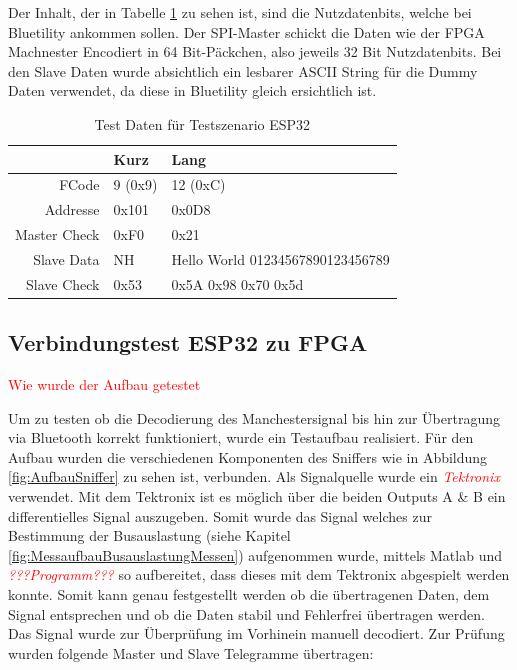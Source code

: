 Der Inhalt, der in Tabelle \ref{tab:TestDataESP32} zu sehen ist, sind die Nutzdatenbits, welche bei Bluetility ankommen sollen. Der SPI-Master schickt die Daten wie der FPGA Machnester Encodiert in 64 Bit-Päckchen, also jeweils 32 Bit Nutzdatenbits. Bei den Slave Daten wurde absichtlich ein lesbarer ASCII String für die Dummy Daten verwendet, da diese in Bluetility gleich ersichtlich ist.

\begin{table}[H]
    \centering
    \begin{tabular}{r||l|l}
         & Kurz & Lang\\ \hline
        FCode & 9 (0x9) & 12 (0xC)\\ \hline
        Addresse & 0x101 & 0x0D8\\ \hline
        Master Check & 0xF0 & 0x21\\ \hline
        Slave Data & NH & Hello World 01234567890123456789\\ \hline
        Slave Check & 0x53 & 0x5A 0x98 0x70 0x5d\\ 
    \end{tabular}
    \caption{Test Daten für Testszenario ESP32}
    \label{tab:TestDataESP32}
\end{table}




\subsection{Verbindungstest ESP32 zu FPGA}
\textcolor{red}{Wie wurde der Aufbau getestet}

Um zu testen ob die Decodierung des Manchestersignal bis hin zur Übertragung via Bluetooth korrekt funktioniert, wurde ein Testaufbau realisiert. Für den Aufbau wurden die verschiedenen Komponenten des Sniffers wie in Abbildung \ref{fig:AufbauSniffer} zu sehen ist, verbunden. Als Signalquelle wurde ein \textcolor{red}{\textit{Tektronix}} verwendet. Mit dem Tektronix ist es möglich über die beiden Outputs A \& B ein differentielles Signal auszugeben. Somit wurde das Signal welches zur Bestimmung der Busauslastung (siehe Kapitel \ref{fig:MessaufbauBusauslastungMessen}) aufgenommen wurde, mittels Matlab und \textcolor{red}{\textit{???Programm???}} so aufbereitet, dass dieses mit dem Tektronix abgespielt werden konnte.
Somit kann genau festgestellt werden ob die übertragenen Daten, dem Signal entsprechen und ob die Daten stabil und Fehlerfrei übertragen werden. Das Signal wurde zur Überprüfung im Vorhinein manuell decodiert.
Zur Prüfung wurden folgende Master und Slave Telegramme übertragen:

